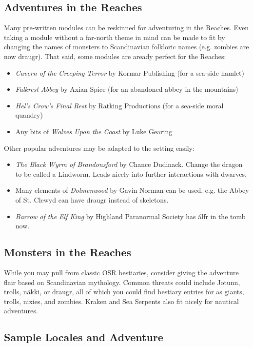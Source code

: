 \documentclass[notitlepage]{article}
\begin{document}
\begin{multicols}{2}
  \section{Adventures in the Reaches}

  Many pre-written modules can be reskinned for adventuring in the Reaches.
  Even taking a module without a far-north theme in mind can be made to fit by changing the names of monsters to Scandinavian folkloric names (e.g. zombies are now draugr).
  That said, some modules are aready perfect for the Reaches:

  \begin{itemize}
  \item \emph{Cavern of the Creeping Terror} by Kormar Publishing (for a sea-side hamlet)
  \item \emph{Falkrest Abbey} by Axian Spice (for an abandoned abbey in the mountains)
  \item \emph{Hel's Crow's Final Rest} by Ratking Productions (for a sea-side moral quandry)
  \item Any bits of \emph{Wolves Upon the Coast} by Luke Gearing
  \end{itemize}

  Other popular adventures may be adapted to the setting easily:

  \begin{itemize}
  \item \emph{The Black Wyrm of Brandonsford} by Chance Dudinack. Change the dragon to be called a Lindworm. Leads nicely into further interactions with dwarves.
  \item Many elements of \emph{Dolmenwood} by Gavin Norman can be used, e.g. the Abbey of St. Clewyd can have draugr instead of skeletons.
  \item \emph{Barrow of the Elf King} by Highland Paranormal Society has \'alfr in the tomb now.
  \end{itemize}

  \subsection*{Monsters in the Reaches}

  While you may pull from classic OSR bestiaries, consider giving the adventure flair based on Scandinavian mythology. Common threats could include Jotunn, trolls, n\"akki, or draugr, all of which you could find bestiary entries for as giants, trolls, nixies, and zombies. Kraken and Sea Serpents also fit nicely for nautical adventures. \\

  \subsection*{Sample Locales and Adventure}

  



\end{multicols}
\end{document}
